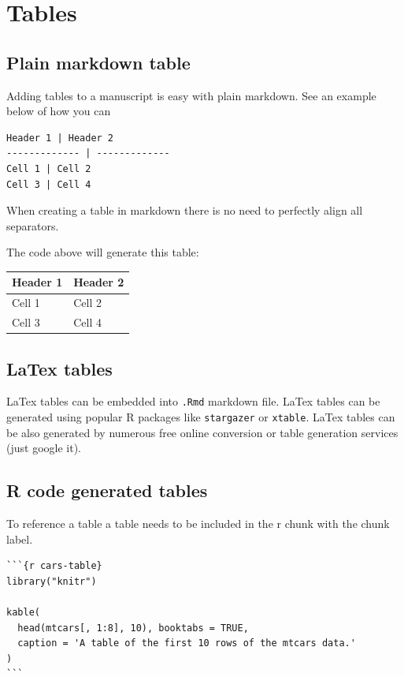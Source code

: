 \documentclass[]{book}
\begin{document}
\section{Tables}\label{tables}

\subsection{Plain markdown table}\label{plain-markdown-table}

Adding tables to a manuscript is easy with plain markdown. See an
example below of how you can

\begin{verbatim}
Header 1 | Header 2
------------- | -------------
Cell 1 | Cell 2
Cell 3 | Cell 4
\end{verbatim}

When creating a table in markdown there is no need to perfectly align
all separators.

The code above will generate this table:

\begin{longtable}[]{@{}ll@{}}
\toprule
Header 1 & Header 2\tabularnewline
\midrule
\endhead
Cell 1 & Cell 2\tabularnewline
Cell 3 & Cell 4\tabularnewline
\bottomrule
\end{longtable}

\subsection{LaTex tables}\label{latex-tables}

LaTex tables can be embedded into \texttt{.Rmd} markdown file. LaTex
tables can be generated using popular R packages like \texttt{stargazer}
or \texttt{xtable}. LaTex tables can be also generated by numerous free
online conversion or table generation services (just google it).

\subsection{R code generated tables}\label{r-code-generated-tables}

To reference a table a table needs to be included in the r chunk with
the chunk label.

\begin{verbatim}
```{r cars-table}
library("knitr")

kable(
  head(mtcars[, 1:8], 10), booktabs = TRUE,
  caption = 'A table of the first 10 rows of the mtcars data.'
)
```
\end{verbatim}
\end{document}
